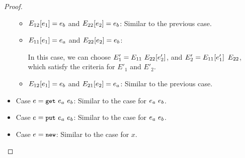 \begin{proof}
\begin{itemize}
\begin{itemize}
    \item $E_{12}\hspace{-0.5mm}\left[e_1\right] = e_b$ and $E_{22}\hspace{-0.5mm}\left[e_2\right] =
      e_b$: Similar to the previous case.
      
    \item $E_{11}\hspace{-0.5mm}\left[e_1\right] = e_a$ and $E_{22}\hspace{-0.5mm}\left[e_2\right] =
      e_b$:

      In this case, we can choose $E'_1 =
      E_{11}~E_{22}\hspace{-0.5mm}\left[e'_2\right]$, and $E'_2 =
      E_{11}\hspace{-0.5mm}\left[e'_1\right]~E_{22}$, which satisfy the
      criteria for $E'_1$ and $E'_2$.


    \item $E_{12}\hspace{-0.5mm}\left[e_1\right] = e_b$ and $E_{21}\hspace{-0.5mm}\left[e_2\right] =
      e_a$: Similar to the previous case.
    \end{itemize}

  \item Case $e = \mbox{\small{\texttt{get}}}~e_a~e_b$: Similar to the case for
    $e_a~e_b$.

  \item Case $e = \mbox{\small{\texttt{put}}}~e_a~e_b$: Similar to the case for
    $e_a~e_b$.

  \item Case $e = \mbox{\small{\texttt{new}}}$: Similar to the case for $x$.
  \end{itemize}
\end{proof}
